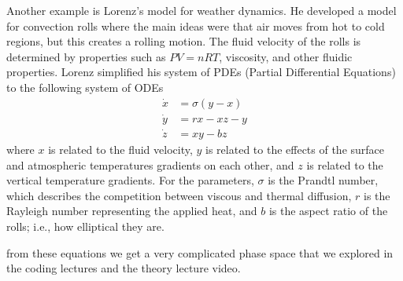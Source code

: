 \documentclass[reqno]{amsart}
\theoremstyle{definition}
\begin{document}
Another example is Lorenz's model for weather dynamics.  He developed a model for convection rolls where the main ideas were that air moves from hot to cold regions, but this creates a rolling motion.  The fluid velocity of the rolls is determined by properties such as $PV = nRT$, viscosity, and other fluidic properties.  Lorenz simplified his system of PDEs (Partial Differential Equations) to the following system of ODEs
%
\begin{equation}
\begin{split}
\dot{x} &= \sigma(y-x)\\
\dot{y} &= rx - xz - y\\
\dot{z} &= xy - bz
\end{split}
\end{equation}
%
where $x$ is related to the fluid velocity, $y$ is related to the effects of the surface and atmospheric temperatures gradients on each other, and $z$ is related to the vertical temperature gradients.  For the parameters, $\sigma$ is the Prandtl number, which describes the competition between viscous and thermal diffusion, $r$ is the Rayleigh number representing the applied heat, and $b$ is the aspect ratio of the rolls; i.e., how elliptical they are.

from these equations we get a very complicated phase space that we explored in the coding lectures and the theory lecture video.
\end{document}
